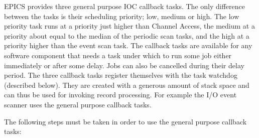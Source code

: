 EPICS provides three general purpose IOC callback tasks. The only difference between the tasks is their scheduling 
priority; low, medium or high. The low priority task runs at a priority just higher than Channel Access, the medium at a 
priority about equal to the median of the periodic scan tasks, and the high at a priority higher than the event scan task. The 
callback tasks are available for any software component that needs a task under which to run some job either immediately 
or after some delay. Jobs can also be cancelled during their delay period. The three callback tasks register themselves with 
the task watchdog (described below). They are created with a generous amount of stack space and can thus be used for 
invoking record processing. For example the I/O event scanner uses the general purpose callback tasks.

The following steps must be taken in order to use the general purpose callback tasks: 

